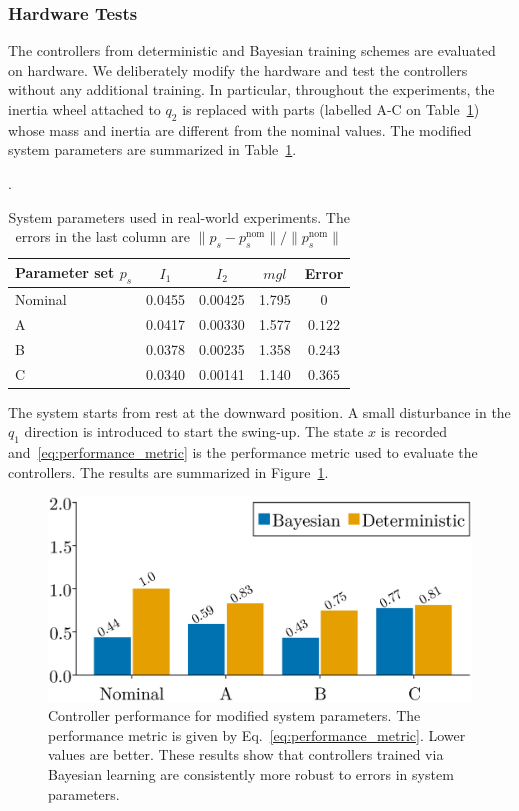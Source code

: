 \subsubsection{Hardware Tests} 
The controllers from deterministic and Bayesian training schemes are
evaluated on hardware. 
%
We deliberately modify the hardware and test the controllers without any
additional training.
%
In particular, throughout the experiments, the inertia wheel attached to $q_2$
is replaced with parts (labelled A-C on Table~\ref{tab:modified_params}) whose
mass and inertia are different from the nominal values.
%
The modified system parameters are summarized in
Table~\ref{tab:modified_params}.
%
\begin{table}[tb]
    \centering
    \caption{System parameters used in real-world experiments. The errors in the
    last column are $\|p_s - p^{\textrm{nom}}_{s}\| / \|p^{\textrm{nom}}_{s}\|$}.
    \begin{tabular}{lcccc}
    \toprule
    Parameter set $p_s$ & $I_1$ & $I_2$ & $mgl$ & Error \\
    \midrule
    Nominal & 0.0455 & 0.00425 & 1.795 & 0 \\
    A & 0.0417 & 0.00330 & 1.577 & $0.122$ \\
    B & 0.0378 & 0.00235 & 1.358 & $0.243$ \\
    C & 0.0340 & 0.00141 & 1.140 & $0.365$ \\
    \bottomrule
    \end{tabular}
    \label{tab:modified_params}
\end{table}
    
The system starts from rest at the downward position. 
%
A small disturbance in the $q_1$ direction is introduced to start the swing-up.
%
The state $x$ is recorded and~\eqref{eq:performance_metric} is the
performance metric used to evaluate the controllers. The results are
summarized in Figure~\ref{fig:neuralpbc_bar_plot}.
%
\begin{figure}[t]
    \centering
    \includegraphics[width=0.6\linewidth]{./figures/pbc_bar.eps}
    \caption{
        Controller performance for modified system parameters. 
        The performance metric is given by
        Eq.~\eqref{eq:performance_metric}.
        Lower values are better. 
        These results show that controllers trained via Bayesian learning are
        consistently more robust to errors in system parameters.
    }
    \label{fig:neuralpbc_bar_plot}
\end{figure}

